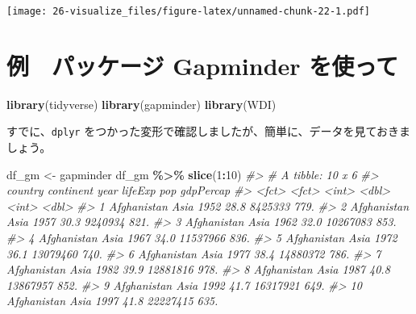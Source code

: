 \documentclass[
  xelatex, ja=standard]{bxjsbook}
\newenvironment{Shaded}{\begin{snugshade}}{\end{snugshade}}
\newcommand{\CommentTok}[1]{\textcolor[rgb]{0.56,0.35,0.01}{\textit{#1}}}
\newcommand{\DecValTok}[1]{\textcolor[rgb]{0.00,0.00,0.81}{#1}}
\newcommand{\FunctionTok}[1]{\textcolor[rgb]{0.13,0.29,0.53}{\textbf{#1}}}
\newcommand{\NormalTok}[1]{#1}
\newcommand{\OtherTok}[1]{\textcolor[rgb]{0.56,0.35,0.01}{#1}}
\newcommand{\SpecialCharTok}[1]{\textcolor[rgb]{0.81,0.36,0.00}{\textbf{#1}}}
\theoremstyle{definition}
\theoremstyle{definition}
\theoremstyle{definition}
\theoremstyle{definition}
\theoremstyle{remark}
\begin{document}
\texttt{[image: 26-visualize\_files/figure-latex/unnamed-chunk-22-1.pdf]}

\hypertarget{ux4f8b-ux30d1ux30c3ux30b1ux30fcux30b8-gapminder-ux3092ux4f7fux3063ux3066}{%
\section{例　パッケージ Gapminder を使って}\label{ux4f8b-ux30d1ux30c3ux30b1ux30fcux30b8-gapminder-ux3092ux4f7fux3063ux3066}}

\begin{Shaded}
\begin{Highlighting}[]
\FunctionTok{library}\NormalTok{(tidyverse)}
\FunctionTok{library}\NormalTok{(gapminder)}
\FunctionTok{library}\NormalTok{(WDI)}
\end{Highlighting}
\end{Shaded}

すでに、\texttt{dplyr} をつかった変形で確認しましたが、簡単に、データを見ておきましょう。

\begin{Shaded}
\begin{Highlighting}[]
\NormalTok{df\_gm }\OtherTok{\textless{}{-}}\NormalTok{ gapminder}
\NormalTok{df\_gm }\SpecialCharTok{\%\textgreater{}\%} \FunctionTok{slice}\NormalTok{(}\DecValTok{1}\SpecialCharTok{:}\DecValTok{10}\NormalTok{)}
\CommentTok{\#\textgreater{} \# A tibble: 10 x 6}
\CommentTok{\#\textgreater{}    country     continent  year lifeExp      pop gdpPercap}
\CommentTok{\#\textgreater{}    \textless{}fct\textgreater{}       \textless{}fct\textgreater{}     \textless{}int\textgreater{}   \textless{}dbl\textgreater{}    \textless{}int\textgreater{}     \textless{}dbl\textgreater{}}
\CommentTok{\#\textgreater{}  1 Afghanistan Asia       1952    28.8  8425333      779.}
\CommentTok{\#\textgreater{}  2 Afghanistan Asia       1957    30.3  9240934      821.}
\CommentTok{\#\textgreater{}  3 Afghanistan Asia       1962    32.0 10267083      853.}
\CommentTok{\#\textgreater{}  4 Afghanistan Asia       1967    34.0 11537966      836.}
\CommentTok{\#\textgreater{}  5 Afghanistan Asia       1972    36.1 13079460      740.}
\CommentTok{\#\textgreater{}  6 Afghanistan Asia       1977    38.4 14880372      786.}
\CommentTok{\#\textgreater{}  7 Afghanistan Asia       1982    39.9 12881816      978.}
\CommentTok{\#\textgreater{}  8 Afghanistan Asia       1987    40.8 13867957      852.}
\CommentTok{\#\textgreater{}  9 Afghanistan Asia       1992    41.7 16317921      649.}
\CommentTok{\#\textgreater{} 10 Afghanistan Asia       1997    41.8 22227415      635.}
\end{Highlighting}
\end{Shaded}
\end{document}
